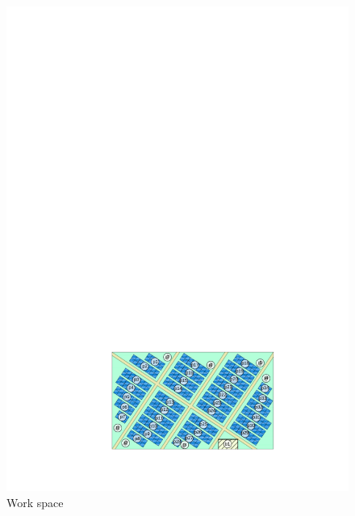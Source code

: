 \begin{figure}
	\includegraphics[width=0.36\textheight]{figure/background.pdf}
	\caption{Work space}
	\label{workspace}
\end{figure}

